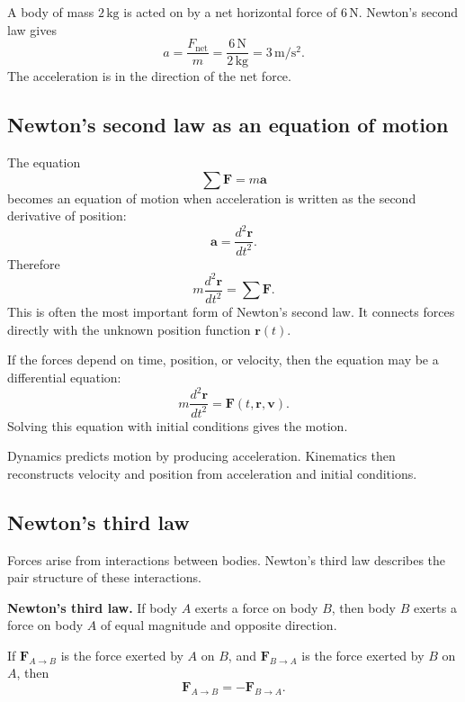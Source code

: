 \begin{examplebox}
A body of mass \(2\,\mathrm{kg}\) is acted on by a net horizontal force of \(6\,\mathrm{N}\). Newton's second law gives
\[
a=\frac{F_{\mathrm{net}}}{m}
=\frac{6\,\mathrm{N}}{2\,\mathrm{kg}}
=3\,\mathrm{m/s^2}.
\]
The acceleration is in the direction of the net force.
\end{examplebox}

\subsection{Newton's second law as an equation of motion}

The equation
\[
\sum \mathbf{F}=m\mathbf{a}
\]
becomes an equation of motion when acceleration is written as the second derivative of position:
\[
\mathbf{a}=\frac{d^2\mathbf{r}}{dt^2}.
\]
Therefore
\[
 m\frac{d^2\mathbf{r}}{dt^2}=\sum \mathbf{F}.
\]
This is often the most important form of Newton's second law. It connects forces directly with the unknown position function \(\mathbf{r}(t)\).

If the forces depend on time, position, or velocity, then the equation may be a differential equation:
\[
 m\frac{d^2\mathbf{r}}{dt^2}=\mathbf{F}(t,\mathbf{r},\mathbf{v}).
\]
Solving this equation with initial conditions gives the motion.

\begin{remarkbox}
Dynamics predicts motion by producing acceleration. Kinematics then reconstructs velocity and position from acceleration and initial conditions.
\end{remarkbox}

\subsection{Newton's third law}

Forces arise from interactions between bodies. Newton's third law describes the pair structure of these interactions.

\begin{theorembox}
\textbf{Newton's third law.} If body \(A\) exerts a force on body \(B\), then body \(B\) exerts a force on body \(A\) of equal magnitude and opposite direction.
\end{theorembox}

If \(\mathbf{F}_{A\to B}\) is the force exerted by \(A\) on \(B\), and \(\mathbf{F}_{B\to A}\) is the force exerted by \(B\) on \(A\), then
\[
\mathbf{F}_{A\to B}=-\mathbf{F}_{B\to A}.
\]

